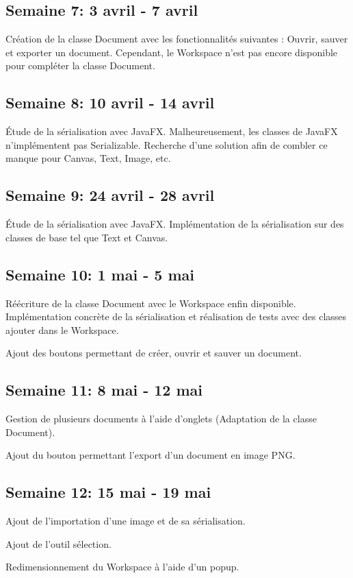\subsection{Semaine 7: 3 avril - 7 avril}
Création de la classe Document avec les fonctionnalités suivantes : Ouvrir, sauver et exporter un document. Cependant, le Workspace n'est pas encore disponible pour compléter la classe Document.

\subsection{Semaine 8: 10 avril - 14 avril}
Étude de la sérialisation avec JavaFX. Malheureusement, les classes de JavaFX n'implémentent pas Serializable. Recherche d'une solution afin de combler ce manque pour Canvas, Text, Image, etc.

\subsection{Semaine 9: 24 avril - 28 avril}
Étude de la sérialisation avec JavaFX. Implémentation de la sérialisation sur des classes de base tel que Text et Canvas. 

\subsection{Semaine 10: 1 mai - 5 mai}
Réécriture de la classe Document avec le Workspace enfin disponible. Implémentation concrète de la sérialisation et réalisation de tests avec des classes ajouter dans le Workspace.

Ajout des boutons permettant de créer, ouvrir et sauver un document.

\subsection{Semaine 11: 8 mai - 12 mai} 
Gestion de plusieurs documents à l'aide d'onglets (Adaptation de la classe Document). 

Ajout du bouton permettant l'export d'un document en image PNG.

\subsection{Semaine 12: 15 mai - 19 mai}
Ajout de l'importation d'une image et de sa sérialisation. 

Ajout de l'outil sélection.

Redimensionnement du Workspace à l'aide d'un popup.

